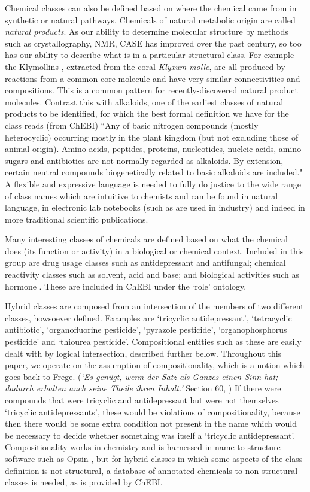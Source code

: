 \documentclass[10pt]{bmc_article}
\newenvironment{bmcformat}{\baselineskip20pt\sloppy\setboolean{publ}{false}}{\baselineskip20pt\sloppy}
\begin{document}
\begin{bmcformat}
Chemical classes can also be defined based on where the chemical came from in synthetic or natural pathways. Chemicals of natural metabolic origin are called \textit{natural products}.  As our ability to determine molecular structure by methods such as crystallography, NMR, CASE has improved over the past century, so too has our ability to describe what is in a particular structural class.  For example the Klymollins \cite{hsu2011}, extracted from the coral \textit{Klyxum molle}, are all produced by reactions from a common core molecule and have very similar connectivities and compositions. This is a common pattern for recently-discovered natural product molecules.  Contrast this with alkaloids, one of the earliest classes of natural products to be identified, for which the best formal definition we have for the class reads (from ChEBI) ``Any of basic nitrogen compounds (mostly heterocyclic) occurring mostly in the plant kingdom (but not excluding those of animal origin). Amino acids, peptides, proteins, nucleotides, nucleic acids, amino sugars and antibiotics are not normally regarded as alkaloids. By extension, certain neutral compounds biogenetically related to basic alkaloids are included." A flexible and expressive language is needed to fully do justice to the wide range of class names which are intuitive to chemists and can be found in natural language, in electronic lab notebooks (such as are used in industry) and indeed in more traditional scientific publications. 

Many interesting classes of chemicals are defined based on what the chemical does (its function or activity) in a biological or chemical context. Included in this group are drug usage classes such as antidepressant and antifungal; chemical reactivity classes such as solvent, acid and base; and biological activities such as hormone \cite{batchelor2010}. These are included in ChEBI under the `role' ontology. 

Hybrid classes are composed from an intersection of the members of two different classes, howsoever defined.  Examples are `tricyclic antidepressant', `tetracyclic antibiotic', `organofluorine pesticide', `pyrazole pesticide', `organophosphorus pesticide' and `thiourea pesticide'. Compositional entities such as these are easily dealt with by logical intersection, described further below. 
Throughout this paper, we operate on the assumption of compositionality, which is a notion which goes back to Frege.  (\textit{`Es gen\"{u}gt, wenn der Satz als Ganzes einen Sinn hat; dadurch erhalten auch seine Theile ihren Inhalt.'} Section 60, \cite{Frege1884-FREGDA-3})
If there were compounds that were tricyclic and antidepressant but were not themselves `tricyclic antidepressants', these would be violations of compositionality, because then there would be some extra condition not present in the name which would be necessary to decide whether something was itself a `tricyclic antidepressant'.
Compositionality works in chemistry and is harnessed in name-to-structure software such as Opsin \cite{lowe2011}, but for hybrid classes in which some aspects of the class definition is not structural, a database of annotated chemicals to non-structural classes is needed, as is provided by ChEBI. 


\end{bmcformat}
\end{document}
